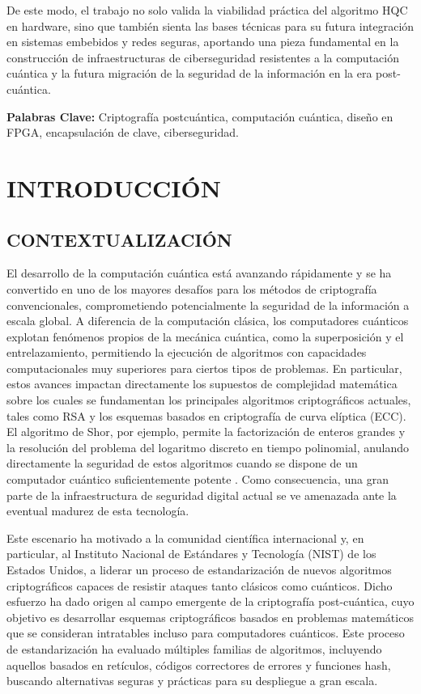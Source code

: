 De este modo, el trabajo no solo valida la viabilidad práctica del algoritmo HQC en hardware, sino que también sienta las bases técnicas para su futura integración en sistemas embebidos y redes seguras, aportando una pieza fundamental en la construcción de infraestructuras de ciberseguridad resistentes a la computación cuántica y la futura migración de la seguridad de la información en la era post-cuántica.

\textbf{Palabras Clave: }Criptografía postcuántica, computación cuántica, diseño en FPGA, encapsulación de clave, ciberseguridad.

\newpage

\chapter{INTRODUCCIÓN}
\section{CONTEXTUALIZACIÓN}
El desarrollo de la computación cuántica está avanzando rápidamente y se ha convertido en uno de los mayores desafíos para los métodos de criptografía convencionales, comprometiendo potencialmente la seguridad de la información a escala global. A diferencia de la computación clásica, los computadores cuánticos explotan fenómenos propios de la mecánica cuántica, como la superposición y el entrelazamiento, permitiendo la ejecución de algoritmos con capacidades computacionales muy superiores para ciertos tipos de problemas. En particular, estos avances impactan directamente los supuestos de complejidad matemática sobre los cuales se fundamentan los principales algoritmos criptográficos actuales, tales como RSA y los esquemas basados en criptografía de curva elíptica (ECC). El algoritmo de Shor, por ejemplo, permite la factorización de enteros grandes y la resolución del problema del logaritmo discreto en tiempo polinomial, anulando directamente la seguridad de estos algoritmos cuando se dispone de un computador cuántico suficientemente potente \cite{GidneyEkera2021}. Como consecuencia, una gran parte de la infraestructura de seguridad digital actual se ve amenazada ante la eventual madurez de esta tecnología.

Este escenario ha motivado a la comunidad científica internacional y, en particular, al Instituto Nacional de Estándares y Tecnología (NIST) de los Estados Unidos, a liderar un proceso de estandarización de nuevos algoritmos criptográficos capaces de resistir ataques tanto clásicos como cuánticos. Dicho esfuerzo ha dado origen al campo emergente de la criptografía post-cuántica, cuyo objetivo es desarrollar esquemas criptográficos basados en problemas matemáticos que se consideran intratables incluso para computadores cuánticos. Este proceso de estandarización ha evaluado múltiples familias de algoritmos, incluyendo aquellos basados en retículos, códigos correctores de errores y funciones hash, buscando alternativas seguras y prácticas para su despliegue a gran escala.

